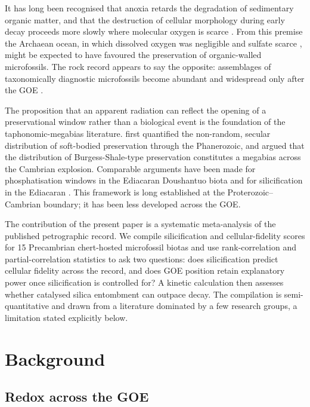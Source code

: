 \documentclass[11pt]{article}
\begin{document}
It has long been recognised that anoxia retards the degradation of sedimentary organic matter, and
that the destruction of cellular morphology during early decay proceeds more slowly where molecular
oxygen is scarce \citep{Canfield1994,Hedges1995}. From this premise the Archaean ocean, in which
dissolved oxygen was negligible \citep{Pavlov2002} and sulfate scarce \citep{Habicht2002,Crowe2014},
might be expected to have favoured the preservation of organic-walled microfossils. The rock record
appears to say the opposite: assemblages of taxonomically diagnostic microfossils become abundant
and widespread only after the GOE \citep{Javaux2018,Wacey2014}.

The proposition that an apparent radiation can reflect the opening of a preservational window rather
than a biological event is the foundation of the taphonomic-megabias literature. \citet{Allison1993}
first quantified the non-random, secular distribution of soft-bodied preservation through the
Phanerozoic, and \citet{Butterfield2003} argued that the distribution of Burgess-Shale-type
preservation constitutes a megabias across the Cambrian explosion. Comparable arguments have been
made for phosphatisation windows in the Ediacaran Doushantuo biota and for silicification in the
Ediacaran \citep{Tarhan2016}. This framework is long established at the Proterozoic--Cambrian
boundary; it has been less developed across the GOE.

The contribution of the present paper is a systematic meta-analysis of the published petrographic
record. We compile silicification and cellular-fidelity scores for 15 Precambrian chert-hosted
microfossil biotas and use rank-correlation and partial-correlation statistics to ask two questions:
does silicification predict cellular fidelity across the record, and does GOE position retain
explanatory power once silicification is controlled for? A kinetic calculation then assesses whether
catalysed silica entombment can outpace decay. The compilation is semi-quantitative and drawn from a
literature dominated by a few research groups, a limitation stated explicitly below.

\section{Background}

\subsection{Redox across the GOE}
\end{document}
